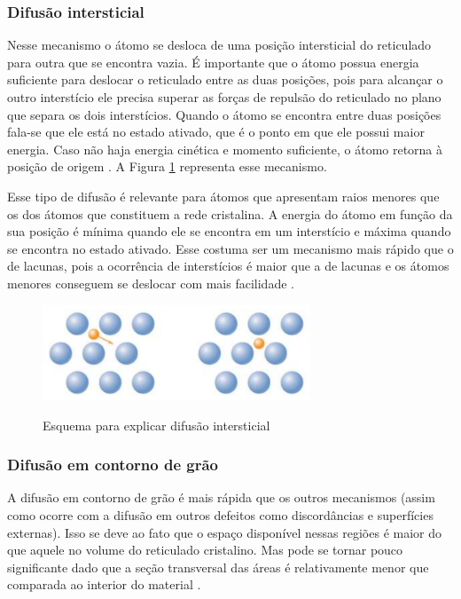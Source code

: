\documentclass[]{politex}
\begin{document}
\subsubsection{Difusão intersticial}
	Nesse mecanismo o átomo se desloca de uma posição intersticial do reticulado para outra que se encontra vazia. É importante que o átomo possua energia suficiente para deslocar o reticulado entre as duas posições, pois para alcançar o outro interstício ele precisa superar as forças de repulsão do reticulado no plano que separa os dois interstícios. Quando o átomo se encontra entre duas posições fala-se que ele está no estado ativado, que é o ponto em que ele possui maior energia. Caso não haja energia cinética e momento suficiente, o átomo retorna à posição de origem \cite{glicksman2000diffusion}. A Figura \ref{fig:dif-insterticial} representa esse mecanismo.
	
	Esse tipo de difusão é relevante para átomos que apresentam raios menores que os dos átomos que constituem a rede cristalina. A energia do átomo em função da sua posição é mínima quando ele se encontra em um interstício e máxima quando se encontra no estado ativado. Esse costuma ser um mecanismo mais rápido que o de lacunas, pois a ocorrência de interstícios é maior que a de lacunas e os átomos menores conseguem se deslocar com mais facilidade \cite{murty2013introduction}.
	
	\begin{figure}[ht]
	\caption{Esquema para explicar difusão intersticial}
	\includegraphics[width=80mm,scale=0.5]{dif-intersticio}
	\label{fig:dif-insterticial}
	\centering
\end{figure}
	

	
\subsubsection{Difusão em contorno de grão}
A difusão em contorno de grão é mais rápida que os outros mecanismos (assim como ocorre com a difusão em outros defeitos como discordâncias e superfícies externas). Isso se deve ao fato que o espaço disponível nessas regiões é maior do que aquele no volume do reticulado cristalino. Mas pode se tornar pouco significante dado que a seção transversal das áreas é relativamente menor que comparada ao interior do material \cite{callister2007materials}. 
\end{document}

